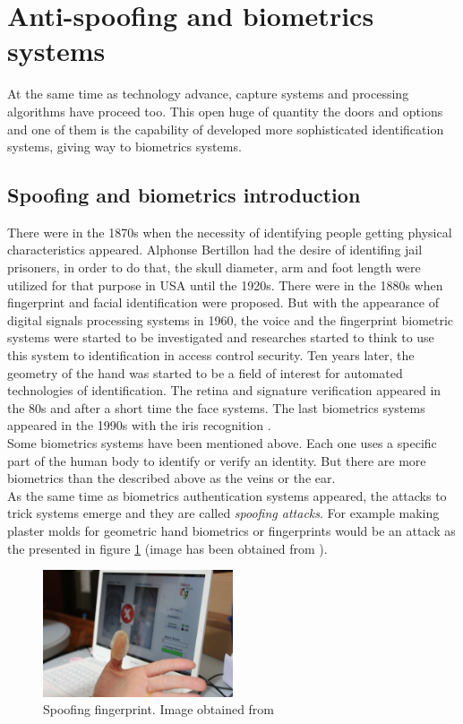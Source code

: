 \section{Anti-spoofing and biometrics systems}
At the same time as technology advance, capture systems and processing algorithms have proceed too. This open huge of quantity the doors and options and one of them is the capability of developed more sophisticated identification systems, giving way to biometrics systems.\\

\subsection{Spoofing and biometrics introduction}
There were in the 1870s when the necessity of identifying people getting physical characteristics appeared. Alphonse Bertillon had the desire of identifing jail prisoners, in order to do that,   the skull diameter, arm and foot length were utilized for that purpose in USA until the 1920s. There were in the 1880s when fingerprint and facial identification were proposed. But with the appearance of digital signals processing systems in 1960, the voice and the fingerprint biometric systems were started to be investigated and researches started to think to use this system to identification in access control security. Ten years later, the geometry of the hand was started to be a field of interest for automated technologies of identification. The retina and signature verification appeared in the 80s and after a short time the face systems. The last biometrics systems appeared in the 1990s with the iris recognition \cite{Intro_biometrics}.\\

Some biometrics systems have been mentioned above. Each one uses a specific part of the human body to identify or verify an identity. But there are more biometrics than the described above as the veins or the ear.\\

As the same time as biometrics authentication systems appeared, the attacks to trick systems emerge and they are called \textit{spoofing attacks}. For example making plaster molds for geometric hand biometrics or fingerprints would be an attack as the presented in figure \ref{fig:Spoof_fingerprint} (image has been obtained from \cite{fingerprint_image}).\\


\begin{figure}[htb]
\centering
\includegraphics[width=0.5\textwidth]{images_miscelaneus/spoofing_fingerprint.jpg}
\caption{Spoofing fingerprint. Image obtained from \cite{fingerprint_image}} \label{fig:Spoof_fingerprint}
\end{figure}

